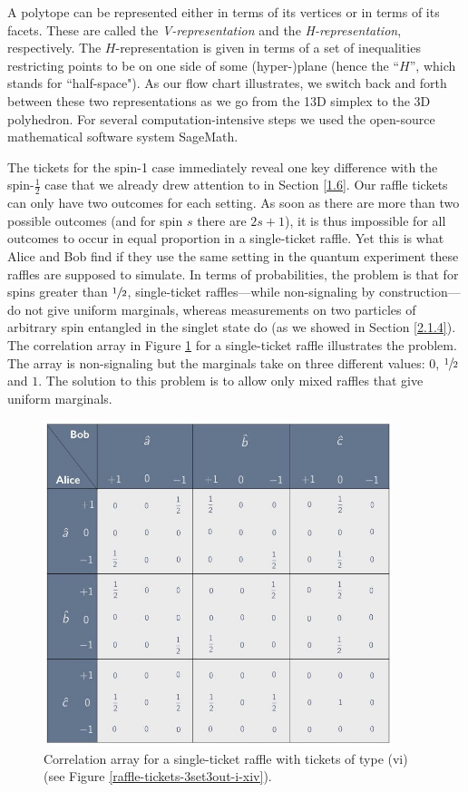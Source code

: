 A polytope can be represented either in terms of its vertices or in terms of its facets. These are called the \emph{V-representation} and the \emph{H-representation}, respectively. The $H$-representation is given in terms of a set of inequalities restricting points to be on one side of some (hyper-)plane (hence the ``$H$'', which stands for ``half-space"). As our flow chart illustrates, we switch back and forth between these two representations as we go from the 13D simplex to the 3D polyhedron. For several computation-intensive
steps we used the open-source mathematical software system SageMath. 

The tickets for the spin-1 case immediately reveal one key difference with the spin-$\frac12$ case that we already drew attention to in Section \ref{1.6}. Our raffle tickets can only have two outcomes for each setting. As soon as there are more than two possible outcomes (and for spin $s$ there are $2s + 1$), it is thus impossible for all outcomes to occur in equal proportion in a single-ticket raffle. Yet this is what Alice and Bob find if they use the same setting in the quantum experiment these raffles are supposed to simulate. In terms of probabilities, the problem is that for spins greater than $\sfrac12$, single-ticket raffles---while non-signaling by construction---do not give uniform marginals, whereas measurements on two particles of arbitrary spin entangled in the singlet state do (as we showed in Section \ref{2.1.4}). The correlation array in Figure \ref{CA-3set3out-raffle-vi} for a single-ticket raffle illustrates the problem. The array is non-signaling but the marginals take on three different values: $0$, $\sfrac12$ and $1$. The solution to this problem is to allow only mixed raffles that give uniform marginals. 

\begin{figure}[ht]
 \centering
   \includegraphics[width=4in]{CA-3set3out-raffle-vi.jpeg} 
   \caption{Correlation array for a single-ticket raffle with tickets of type (vi) (see Figure \ref{raffle-tickets-3set3out-i-xiv}).}
   \label{CA-3set3out-raffle-vi}
\end{figure}

